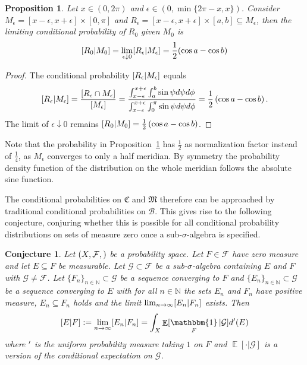 \documentclass[a4paper]{report}
\theoremstyle{plain}
\newtheorem{proposition}[theorem]{Proposition}
\newtheorem{conjecture}[theorem]{Conjecture}
\theoremstyle{definition}
\theoremstyle{remark}
\numberwithin{equation}{chapter}
\newcommand{\N}{\mathbb{N}}
\let\P\relax
\DeclareMathOperator{\P}{\mathbb{P}}
\DeclareMathOperator{\E}{\mathbb{E}}
\DeclareMathOperator{\1}{\mathbbm{1}}
\newcommand{\F}{\mathcal{F}}
\renewcommand{\G}{\mathcal{G}}
\newcommand{\B}{\mathcal{B}}
\begin{document}
\begin{proposition}\label{prop:BorelMerBayes}
Let $x\in(0,2\pi)$ and $\epsilon\in(0,\min\{2\pi-x,x\})$. Consider $M_\epsilon=[x-\epsilon,x+\epsilon]\times[0,\pi]$ and $R_\epsilon=[x-\epsilon,x+\epsilon]\times[a,b]\subseteq M_\epsilon$, then the limiting conditional probability of $R_0$ given $M_0$ is
\begin{equation}
\P[R_0|M_0]=\lim_{\epsilon\downarrow0}\P[R_\epsilon|M_\epsilon]=\frac{1}{2}(\cos a-\cos b)
\end{equation}
\end{proposition}
\begin{proof}
The conditional probability $\P[R_\epsilon|M_\epsilon]$ equals
\begin{equation}
\P[R_\epsilon|M_\epsilon]=\frac{\P[R_\epsilon\cap M_\epsilon]}{\P[M_\epsilon]}=\frac{\int_{x-\epsilon}^{x+\epsilon}\int_a^b\sin\psi d\psi d\phi}{\int_{x-\epsilon}^{x+\epsilon}\int_0^{\pi}\sin\psi d\psi d\phi}=\frac{1}{2}\left(\cos a-\cos b\right).
\end{equation}
The limit of $\epsilon\downarrow0$ remains $\P[R_0|M_0]=\frac{1}{2}\left(\cos a-\cos b\right)$.
\end{proof}

Note that the probability in Proposition~\ref{prop:BorelMerBayes} has $\frac{1}{2}$ as normalization factor instead of $\frac{1}{4}$, as $M_\epsilon$ converges to only a half meridian. By symmetry the probability density function of the distribution on the whole meridian follows the absolute sine function.

The conditional probabilities on $\mathfrak{C}$ and $\mathfrak{M}$ therefore can be approached by traditional conditional probabilities on $\B$. This gives rise to the following conjecture, conjuring whether this is possible for all conditional probability distributions on sets of measure zero once a sub-$\sigma$-algebra is specified.
\begin{conjecture}\label{con:BorelConjecture}
Let $(X,\F,\P)$ be a probability space. Let $F\in\mathcal{F}$ have zero measure and let $E\subseteq F$ be measurable. Let $\G\subset\F$ be a sub-$\sigma$-algebra containing $E$ and $F$ with $\G\neq\F$. Let $\{F_n\}_{n\in\N}\subset\G$ be a sequence converging to $F$ and $\{E_n\}_{n\in\N}\subset\G$ be a sequence converging to $E$ with for all $n\in\N$ the sets $E_n$ and $F_n$ have positive measure, $E_n\subseteq F_n$ holds and the limit $\lim_{n\to\infty}\P[E_n|F_n]$ exists. Then
\begin{equation}
\P[E|F]:=\lim_{n\to\infty}\P[E_n|F_n]=\int_X\E[\1_F|\mathcal{G}]d\P'(E)
\end{equation}
where $\P'$ is the uniform probability measure taking $1$ on $F$ and $\E[\cdot|\G]$ is a version of the conditional expectation on $\G$.
\end{conjecture}
\end{document}
